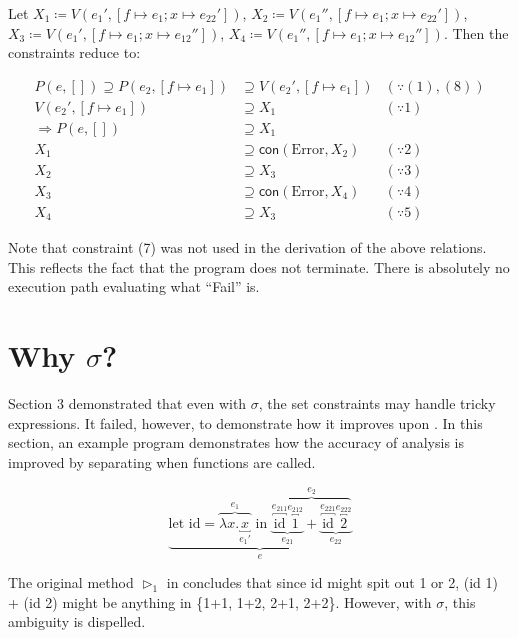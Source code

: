 \documentclass{article}
\begin{document}
Let $X_{1}\coloneq V(e_{1}',[f\mapsto e_{1};x\mapsto e_{22}'])$, $X_{2}\coloneq V(e_{1}'',[f\mapsto e_{1};x\mapsto e_{22}'])$, $X_{3}\coloneq V(e_{1}',[f\mapsto e_{1};x\mapsto e_{12}''])$, $X_{4}\coloneq V(e_{1}'',[f\mapsto e_{1};x\mapsto e_{12}''])$. Then the constraints reduce to:

\begin{align*}
  P(e,[])\supseteq P(e_{2},[f\mapsto e_{1}])&\supseteq V(e_{2}',[f\mapsto e_{1}]) & (\because (1),(8))\\
  V(e_{2}',[f\mapsto e_{1}])&\supseteq X_{1} & (\because 1)\\
  \Rightarrow P(e,[])&\supseteq X_{1} & \\
  X_{1}&\supseteq \mathsf{con}(\text{Error},X_{2}) & (\because 2)\\
  X_{2}&\supseteq X_{3} & (\because 3)\\
  X_{3}&\supseteq \mathsf{con}(\text{Error},X_{4}) & (\because 4)\\
  X_{4}&\supseteq X_{3} & (\because 5)
\end{align*}

Note that constraint (7) was not used in the derivation of the above relations. This reflects the fact that the program does not terminate. There is absolutely no execution path evaluating what ``Fail'' is.

\section{Why $\sigma$?}

Section 3 demonstrated that even with $\sigma$, the set constraints may handle tricky expressions.
It failed, however, to demonstrate how it improves upon \cite{YiRyu97}.
In this section, an example program demonstrates how the accuracy of analysis is improved by separating when functions are called.

\[
\underbrace{\text{let id}= \overbrace{\lambda x.\underbracket{x}_{e_{1}'}}^{e_{1}} \text{ in }\overbrace{\underbrace{\overbracket{\text{id}}^{e_{211}}\overbracket{1}^{e_{212}}}_{e_{21}} + \underbrace{\overbracket{\text{id}}^{e_{221}}\overbracket{2}^{e_{222}}}_{e_{22}}}^{e_{2}}}_{e}
\]

The original method $\rhd_{1}$ in \cite{YiRyu97} concludes that since id might spit out 1 or 2, (id 1) + (id 2) might be anything in \{1+1, 1+2, 2+1, 2+2\}. However, with $\sigma$, this ambiguity is dispelled.
\end{document}
